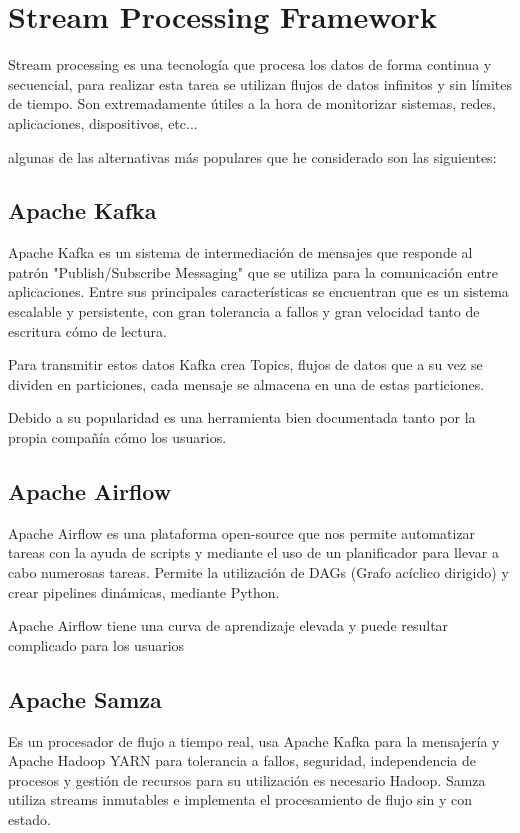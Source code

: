 
\section{Stream Processing Framework}

Stream processing es una tecnología que procesa los datos de forma continua y secuencial, para realizar esta tarea se utilizan flujos de datos infinitos y sin límites de tiempo. Son extremadamente útiles a la hora de monitorizar sistemas, redes, aplicaciones, dispositivos, etc... 

algunas de las alternativas más populares que he considerado son las siguientes:

\subsection{Apache Kafka}

Apache Kafka es un sistema de intermediación de mensajes que responde al patrón "Publish/Subscribe Messaging" que se utiliza para la comunicación entre aplicaciones. Entre sus principales características se encuentran que es un sistema escalable y persistente, con gran tolerancia a fallos y gran velocidad tanto de escritura cómo de lectura.

Para transmitir estos datos Kafka crea Topics, flujos de datos que a su vez se dividen en particiones, cada mensaje se almacena en una de estas particiones.

Debido a su popularidad es una herramienta bien documentada \cite{documentacion:kafka} tanto por la propia compañía cómo los usuarios. \cite{pagina:kafka}

\subsection{Apache Airflow}
Apache Airflow es una plataforma open-source que nos permite automatizar tareas con la ayuda de scripts y mediante el uso de un planificador para llevar a cabo numerosas tareas. Permite la utilización de DAGs (Grafo acíclico dirigido) y crear pipelines dinámicas, mediante Python. 

Apache Airflow tiene una curva de aprendizaje elevada y puede resultar complicado para los usuarios\cite{pagina:HEVO}

\subsection{Apache Samza}
Es un procesador de flujo a tiempo real, usa Apache Kafka para la mensajería y Apache Hadoop YARN para tolerancia a fallos, seguridad, independencia de procesos y gestión de recursos para su utilización es necesario Hadoop. Samza utiliza streams inmutables e implementa el procesamiento de flujo sin y con estado. \cite{pagina:Samza}

